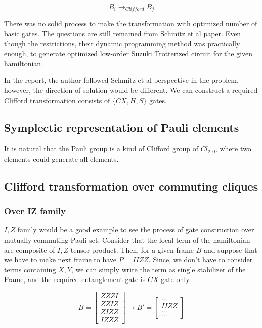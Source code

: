 \documentclass[a4paper,12pt]{article}
\begin{document}
\begin{equation*}
    B_i \rightarrow_{Clifford} B_j
\end{equation*}

There was no solid process to make the transformation with optimized 
number of basic gates.
The questions are still remained from Schmitz et al paper.
Even though the restrictions, their dynamic programming method was practically enough, to generate
optimized low-order Suzuki Trotterized circuit for the given hamiltonian\cite{schmitz_graph_2023}.


In the report, the author followed Schmitz et al perspective in the problem,
however, the direction of solution would be different.
We can construct a required Clifford transformation consists of $\{CX, H, S\}$
gates.

\subsection{Symplectic representation of Pauli elements}

It is natural that the Pauli group is a kind of Clifford group of $Cl_{2,0}$,
where two elements could generate all elements.


\subsection{Clifford transformation over commuting cliques}

\subsubsection{Over IZ family}

$I, Z$ family would be a good example to see the process of gate construction
over mutually commuting Pauli set.
Consider that the local term of the hamiltonian are composite of $I, Z$ tensor product.
Then, for a given frame $B$ and suppose that we have to make next frame to have $P = IIZZ$.
Since, we don't have to consider terms containing $X, Y$, we can simply write the term 
as single stabilizer of the Frame, and the required entanglement gate is $CX$ gate only.

\begin{equation}
    B = \begin{bmatrix}
        ZZZI\\
        ZZIZ\\
        ZIZZ\\
        IZZZ
    \end{bmatrix}
    \rightarrow B' = \begin{bmatrix}
        \dots\\
        IIZZ\\
        \dots\\
        \dots
    \end{bmatrix}
\end{equation}
\end{document}
